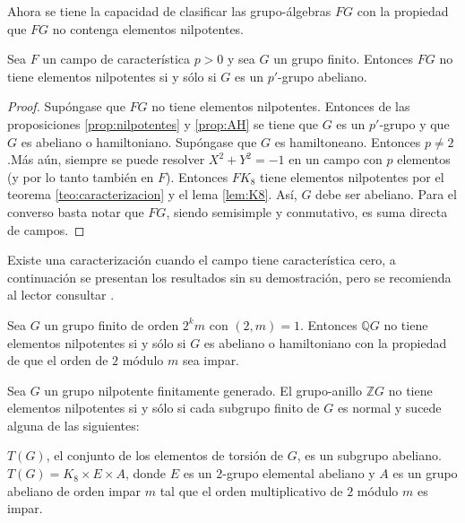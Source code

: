 Ahora se tiene la capacidad de clasificar las grupo-álgebras $FG$ con la propiedad que $FG$ no contenga elementos nilpotentes.
\begin{teorema}\label{teo:caracCarEntera}
Sea $F$ un campo de característica $p > 0$ y sea $G$ un grupo finito. Entonces $FG$ no tiene elementos nilpotentes si y sólo si $G$ es un $p'$-grupo abeliano. 
\end{teorema}
\begin{proof}
Supóngase que $FG$ no tiene elementos nilpotentes. Entonces de las proposiciones \ref{prop:nilpotentes} y \ref{prop:AH} se tiene que $G$ es un $p'$-grupo y que $G$ es abeliano o hamiltoniano. Supóngase que $G$ es hamiltoneano. Entonces $p \neq 2$.Más aún, siempre se puede resolver $X^2 + Y^2 = -1$ en un campo con $p$ elementos (y por lo tanto también en $F$). Entonces $FK_8$ tiene elementos nilpotentes por el teorema \ref{teo:caracterizacion} y el lema \ref{lem:K8}. Así, $G$ debe ser abeliano.
Para el converso basta notar que $FG$, siendo semisimple y conmutativo, es suma directa de campos. 
\end{proof}

Existe una caracterización cuando el campo tiene característica cero, a continuación se presentan los resultados sin su demostración, pero se recomienda al lector consultar \cite{bib:Sehgal}.
\begin{teorema}\label{teo:caracCar0}
Sea $G$ un grupo finito de orden $2^km$ con $(2,m) = 1$. Entonces $\mathds{Q}G$ no tiene elementos nilpotentes si y sólo si $G$ es abeliano o hamiltoniano con la propiedad de que el orden de $2$ módulo $m$ sea impar. 
\end{teorema}

\begin{teorema}
Sea $G$ un grupo nilpotente finitamente generado. El grupo-anillo $\mathds{Z}G$ no tiene elementos nilpotentes si y sólo si cada subgrupo finito de $G$ es normal y sucede alguna de las siguientes:
\begin{bulletList}
\newItem $T(G)$, el conjunto de los elementos de torsión de $G$, es un subgrupo abeliano.
\newItem $T(G) = K_8 \times E \times A$, donde $E$ es un $2$-grupo elemental abeliano y $A$ es un grupo abeliano de orden impar $m$ tal que el orden multiplicativo de $2$ módulo $m$ es impar.  
\end{bulletList}
\end{teorema}